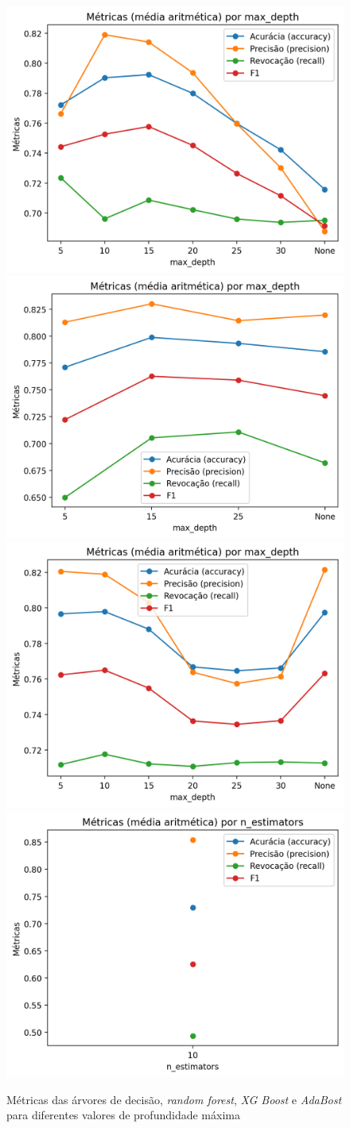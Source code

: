 \documentclass[12pt]{article}
\begin{document}
\begin{figure}[htb]
	\centering
	\includegraphics[width=.49\textwidth]{SUSY DT prof 5 10 15 20 25 30 None}\includegraphics[width=.49\textwidth]{SUSY RF prof 5 15 25 None}
	\includegraphics[width=.49\textwidth]{SUSY XG prof 5 10 15 20 25 30 None}
	\includegraphics[width=.49\textwidth]{SUSY Ada n 10}
	\caption{Métricas das árvores de decisão, \textit{random forest}, \textit{XG Boost} e \textit{AdaBost} para diferentes valores de profundidade máxima}
	\label{SUSY}
\end{figure}
\end{document}
